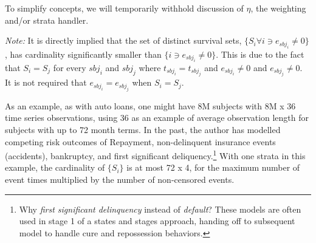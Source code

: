 \documentclass[10pt]{article}
\begin{document}
To simplify concepts, we will temporarily withhold discussion of $\eta$, the weighting and/or strata handler.  


{\em Note:} It is directly implied that the set of distinct survival sets, $\{ S_i \forall i \ni e_{sbj_i} \ne 0 \}$, 
has cardinality significantly smaller than $\{ i \ni e_{sbj_i} \ne 0 \}$. This is due to the fact that $S_i = S_j$ for every $sbj_i$ and
$sbj_j$
where $t_{sbj_i}=t_{sbj_j}$ and $e_{sbj_i} \ne 0$ and $e_{sbj_j} \ne 0$.  It is not required that $e_{sbj_i}=e_{sbj_j}$ when $S_i=S_j$.

As an example, as with auto loans, one might have 8M subjects with 8M x 36 time series observations, using 36 as an example of average
observation length for subjects with up to 72 month terms.  In the past, the author has modelled competing risk outcomes of Repayment, 
non-delinquent insurance events (accidents), bankruptcy, and first significant deliquency.\footnote{Why {\em first significant delinquency} instead of {\em
default}?  These models are often used in stage 1 of a states and stages approach, handing off to subsequent model to handle cure 
and repossession behaviors.}  With one strata in this example, the cardinality of $\{S_i\}$ is at most 72 x 4, for the maximum number of
event times multiplied by the number of non-censored events.
\end{document}
